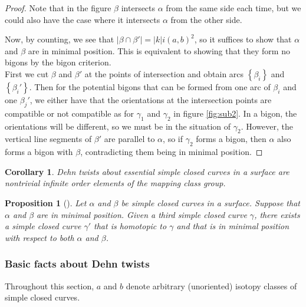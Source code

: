 \documentclass[reqno]{amsart}
\newtheorem{proposition}[theorem]{Proposition}
\newtheorem{corollary}[theorem]{Corollary}
\theoremstyle{definition}
\theoremstyle{remark}
\begin{document}
\begin{proof}
    Note that in the figure $\beta$ intersects $\alpha$ from the
    same side each time, but we could also have the
    case where it intersects $\alpha$ from the other side.

    Now, by counting, we see that
    $\left| \beta \cap \beta' \right| 
    = \left| k \right| i \left( a,b \right)^2$, so
    it suffices to show that $\alpha$ and $\beta$ are in
    minimal position. This is equivalent to showing that
    they form no bigons by the bigon criterion.\\
    
    First we cut $\beta$ and $\beta'$ at the
    points of intersection and obtain arcs
    $\left\{ \beta_i \right\} $ and
    $\left\{ \beta_i' \right\} $.
    Then for the potential bigons that can be formed
    from one arc of $\beta_i$ and one $\beta_j'$, we
    either have that the orientations at the intersection points
    are compatible or not compatible as for
    $\gamma_1$ and $\gamma_2$ in figure \ref{fig:sub2}.
    In a bigon, the orientations will be different, so
    we must be in the situation of $\gamma_2$. However, the
    vertical line segments of $\beta'$ are parallel to $\alpha$,
    so if $\gamma_2$ forms a bigon, then $\alpha$ also
    forms a bigon with $\beta$, contradicting
    them being in minimal position.
\end{proof}


\begin{corollary}
    Dehn twists about essential simple closed curves
    in a surface are nontrivial infinite order elements
    of the mapping class group.
\end{corollary}

\begin{proposition}[]
    Let $\alpha$ and $\beta$ be simple closed curves in a surface.
    Suppose that $\alpha$ and $\beta$ are in minimal position.
    Given a third simple closed curve $\gamma$, there
    exists a simple closed curve $\gamma'$ that is
    homotopic to $\gamma$ and that is in minimal position
    with respect to both $\alpha$ and $\beta$.
\end{proposition}



\subsubsection{Basic facts about Dehn twists}

Throughout this section, $a$ and $b$ denote arbitrary
(unoriented) isotopy classes of simple closed curves.
\end{document}
